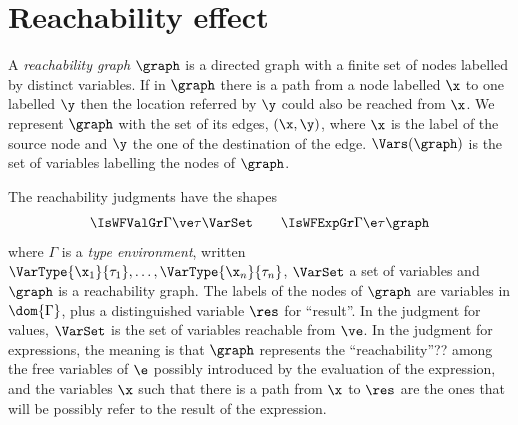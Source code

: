 
\section{Reachability effect}\label{sect:typesystem}


A {\em reachability graph $\graph$} is a directed graph with a finite set of nodes 
labelled by distinct variables. If in $\graph$ there is a path from
a node labelled $\x$ to one labelled $\y$ then the location referred by $\y$ could also be reached from $\x$.
We represent $\graph$ with the set of its edges, $(\x,\y)$, where $\x$ is the label of the source node and
$\y$ the one of the destination of the edge. $\Vars(\graph)$ is the set of variables labelling the nodes of $\graph$.

The reachability judgments have the shapes\[
\IsWFValGr\Gamma\ve\tau\VarSet\qquad\IsWFExpGr\Gamma\e\tau\graph
\]
where $\Gamma$ is a \emph{type {environment}}, written $\VarType{\x_1}{\tau_1},\ldots,\VarType{\x_n}{\tau_n}$, $\VarSet$ a set of variables and
$\graph$ is a reachability graph.  
The labels of the nodes of $\graph$ are variables in $\dom{\Gamma}$, plus a distinguished variable $\res$  for ``result''. 
In the judgment for values, $\VarSet$ is the set of variables reachable from $\ve$.
In the judgment for expressions, the 
meaning is that $\graph$ represents the ``reachability''??  among the free
variables of $\e$ possibly introduced by the evaluation of the expression, and
the variables  $\x$ such that there is a path from $\x$ to $\res$ are the ones that will be
possibly refer to the result of the expression.  

